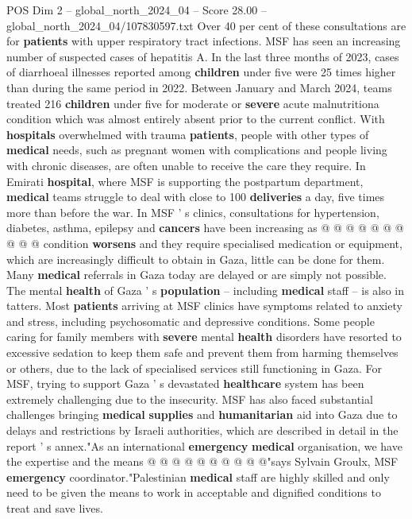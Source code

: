 \begin{textsample}{POS Dim 2 – global\_north\_2024\_04 – Score 28.00 – global\_north\_2024\_04/107830597.txt}
Over 40 per cent of these consultations are for \textbf{patients} with upper respiratory tract infections.
MSF has seen an increasing number of suspected cases of hepatitis A.
In the last three months of 2023, cases of diarrhoeal illnesses reported among \textbf{children} under five were 25 times higher than during the same period in 2022.
Between January and March 2024, teams treated 216 \textbf{children} under five for moderate or \textbf{severe} acute malnutritiona condition which was almost entirely absent prior to the current conflict.
With \textbf{hospitals} overwhelmed with trauma \textbf{patients}, people with other types of \textbf{medical} needs, such as pregnant women with complications and people living with chronic diseases, are often unable to receive the care they require.
In Emirati \textbf{hospital}, where MSF is supporting the postpartum department, \textbf{medical} teams struggle to deal with close to 100 \textbf{deliveries} a day, five times more than before the war.
In MSF ' s clinics, consultations for hypertension, diabetes, asthma, epilepsy and \textbf{cancers} have been increasing as @ @ @ @ @ @ @ @ @ @ condition \textbf{worsens} and they require specialised medication or equipment, which are increasingly difficult to obtain in Gaza, little can be done for them.
Many \textbf{medical} referrals in Gaza today are delayed or are simply not possible.
The mental \textbf{health} of Gaza ' s \textbf{population} -- including \textbf{medical} staff -- is also in tatters.
Most \textbf{patients} arriving at MSF clinics have symptoms related to anxiety and stress, including psychosomatic and depressive conditions.
Some people caring for family members with \textbf{severe} mental \textbf{health} disorders have resorted to excessive sedation to keep them safe and prevent them from harming themselves or others, due to the lack of specialised services still functioning in Gaza.
For MSF, trying to support Gaza ' s devastated \textbf{healthcare} system has been extremely challenging due to the insecurity.
MSF has also faced substantial challenges bringing \textbf{medical} \textbf{supplies} and \textbf{humanitarian} aid into Gaza due to delays and restrictions by Israeli authorities, which are described in detail in the report ' s annex."As an international \textbf{emergency} \textbf{medical} organisation, we have the expertise and the means @ @ @ @ @ @ @ @ @ @"says Sylvain Groulx, MSF \textbf{emergency} coordinator."Palestinian \textbf{medical} staff are highly skilled and only need to be given the means to work in acceptable and dignified conditions to treat and save lives.

\end{textsample}
